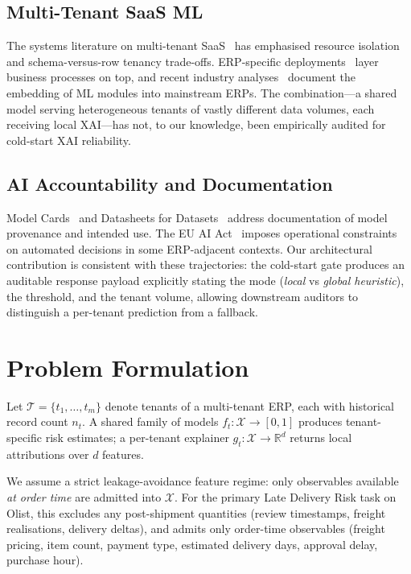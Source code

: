 \documentclass[conference]{IEEEtran}
\newcommand{\nT}{n_t}
\begin{document}
\subsection{Multi-Tenant SaaS ML}
The systems literature on multi-tenant SaaS~\cite{bezemer2010multi,
krebs2014multitenancy} has emphasised resource isolation and
schema-versus-row tenancy trade-offs. ERP-specific
deployments~\cite{haddara2011erp} layer business processes on top, and
recent industry analyses~\cite{gartner2023erp, idc2024ai} document the
embedding of ML modules into mainstream ERPs. The combination---a
shared model serving heterogeneous tenants of vastly different data
volumes, each receiving local XAI---has not, to our knowledge, been
empirically audited for cold-start XAI reliability.

\subsection{AI Accountability and Documentation}
Model Cards~\cite{mitchell2019model} and Datasheets for
Datasets~\cite{gebru2021datasheets} address documentation of model
provenance and intended use. The EU AI Act~\cite{eu2024aiact} imposes
operational constraints on automated decisions in some ERP-adjacent
contexts. Our architectural contribution is consistent with these
trajectories: the cold-start gate produces an auditable response payload
explicitly stating the mode (\textit{local} vs \textit{global heuristic}),
the threshold, and the tenant volume, allowing downstream auditors to
distinguish a per-tenant prediction from a fallback.

\section{Problem Formulation}
\label{sec:problem}

Let $\mathcal{T} = \{t_1, \ldots, t_m\}$ denote tenants of a multi-tenant
ERP, each with historical record count $\nT$. A shared family of models
$f_t : \mathcal{X} \to [0,1]$ produces tenant-specific risk estimates;
a per-tenant explainer $g_t : \mathcal{X} \to \mathbb{R}^d$ returns local
attributions over $d$ features.

We assume a strict leakage-avoidance feature regime: only observables
available \emph{at order time} are admitted into $\mathcal{X}$. For the
primary Late Delivery Risk task on Olist, this excludes any post-shipment
quantities (review timestamps, freight realisations, delivery deltas), and
admits only order-time observables (freight pricing, item count, payment
type, estimated delivery days, approval delay, purchase hour).
\end{document}
